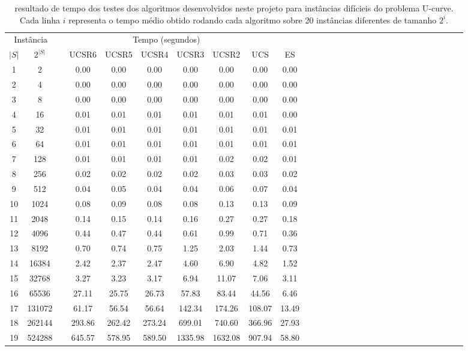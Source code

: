 \documentclass[12pt]{article}
\begin{document}
\begin{table}[ht] \begin{center} \begin{tabular}{@{}ccc ccc ccc ccc ccc ccc ccc ccc ccc cc@{}} \toprule
\multicolumn{2}{c}{Instância} & \multicolumn{7}{c}{Tempo (segundos)}\\
\cline{1-2} \cline{4-10} 
$|S|$ & $2^{|S|}$  &&  UCSR6 & UCSR5 & UCSR4 & UCSR3 & UCSR2 & UCS & ES    \\ \hline
 1 &       2 &&  0.00 & 0.00 & 0.00 & 0.00 & 0.00 & 0.00 & 0.00 & \\ 
 2 &       4 &&  0.00 & 0.00 & 0.00 & 0.00 & 0.00 & 0.00 & 0.00 & \\ 
 3 &       8 &&  0.00 & 0.00 & 0.00 & 0.00 & 0.00 & 0.00 & 0.00 & \\ 
 4 &      16 &&  0.01 & 0.01 & 0.01 & 0.01 & 0.01 & 0.01 & 0.00 & \\ 
 5 &      32 &&  0.01 & 0.01 & 0.01 & 0.01 & 0.01 & 0.01 & 0.01 & \\ 
 6 &      64 &&  0.01 & 0.01 & 0.01 & 0.01 & 0.01 & 0.01 & 0.01 & \\ 
 7 &     128 &&  0.01 & 0.01 & 0.01 & 0.01 & 0.02 & 0.02 & 0.01 & \\ 
 8 &     256 &&  0.02 & 0.02 & 0.02 & 0.02 & 0.03 & 0.03 & 0.02 & \\ 
 9 &     512 &&  0.04 & 0.05 & 0.04 & 0.04 & 0.06 & 0.07 & 0.04 & \\ 
10 &    1024 &&  0.08 & 0.09 & 0.08 & 0.08 & 0.13 & 0.13 & 0.09 & \\ 
11 &    2048 &&  0.14 & 0.15 & 0.14 & 0.16 & 0.27 & 0.27 & 0.18 & \\ 
12 &    4096 &&  0.44 & 0.47 & 0.44 & 0.61 & 0.99 & 0.71 & 0.36 & \\ 
13 &    8192 &&  0.70 & 0.74 & 0.75 & 1.25 & 2.03 & 1.44 & 0.73 & \\ 
14 &   16384 &&  2.42 & 2.37 & 2.47 & 4.60 & 6.90 & 4.82 & 1.52 & \\ 
15 &   32768 &&  3.27 & 3.23 & 3.17 & 6.94 & 11.07 & 7.06 & 3.11 & \\ 
16 &   65536 &&  27.11 & 25.75 & 26.73 & 57.83 & 83.44 & 44.56 & 6.46 & \\ 
17 &  131072 &&  61.17 & 56.54 & 56.64 & 142.34 & 174.26 & 108.07 & 13.49 & \\ 
18 &  262144 &&  293.86 & 262.42 & 273.24 & 699.01 & 740.60 & 366.96 & 27.93 & \\ 
19 &  524288 &&  645.57 & 578.95 & 589.50 & 1335.98 & 1632.08 & 907.94 & 58.80 & \\ 
\bottomrule \end{tabular} \caption{resultado de tempo dos testes dos algoritmos desenvolvidos neste projeto para instâncias difícieis do problema U-curve. Cada linha $i$ representa o tempo médio obtido rodando cada algoritmo sobre 20 instâncias diferentes de tamanho $2^i$.} \label{tab:comparison:time} \end{center} \end{table}
\end{document}
